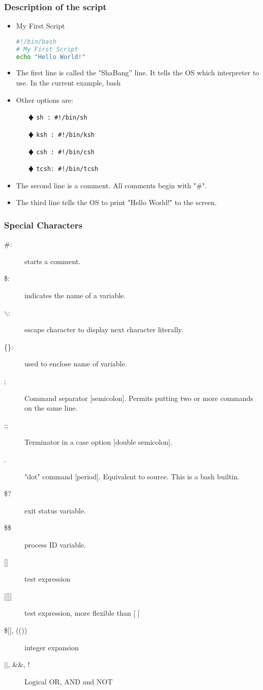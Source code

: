 \documentclass[10pt,t]{beamer}
\begin{document}
\begin{frame}[fragile]
  \frametitle{Description of the script}
  \begin{itemize}
    \item My First Script
  \begin{lstlisting}[language=bash]
#!/bin/bash
# My First Script
echo "Hello World!"
  \end{lstlisting}
    \item The first line is called the "ShaBang'' line. It tells the OS which interpreter to use. In the current example, bash
    \item Other options are:
    \begin{enumerate}
        \item[$\vardiamond$] \texttt{sh\quad\,:   \#!/bin/sh}
        \item[$\vardiamond$] \texttt{ksh :  \#!/bin/ksh}
        \item[$\vardiamond$] \texttt{csh :  \#!/bin/csh}
        \item[$\vardiamond$] \texttt{tcsh: \#!/bin/tcsh}
    \end{enumerate}
    \item The second line is a comment. All comments begin with "\#".
    \item The third line tells the OS to print "Hello World!" to the screen.
  \end{itemize}
\end{frame}

\begin{frame}
  \frametitle{Special Characters}
  \begin{description}
    \item[\#:] starts a comment.
    \item[\$:] indicates the name of a variable.
    \item[$\backslash$:] escape character to display next character literally.
    \item[\{\quad\}:] used to enclose name of variable.
    \item[;] Command separator [semicolon]. Permits putting two or more commands on the same line.
    \item[;;] Terminator in a case option [double semicolon].
    \item[.] "dot" command [period]. Equivalent to source. This is a bash builtin.
    \item[\$?] exit status variable.
    \item[\$\$] process ID variable.
    \item[{[\quad]}] test expression
    \item[{[[\quad]]}] test expression, more flexible than [ ] 
    \item[{\$[\quad], ((\quad))}] integer expansion
    \item[$||$, \&\&, !] Logical OR, AND and NOT
  \end{description}

\end{frame}
\end{document}
